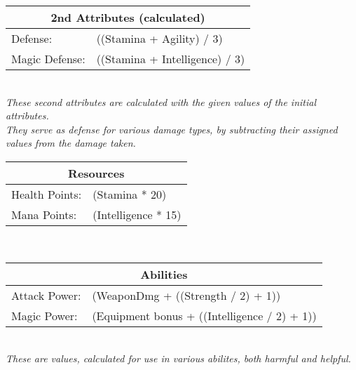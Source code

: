 \begin{center}
\begin{tabular}{|l l|}
\hline
\multicolumn{2}{|c|}{\textbf{2nd Attributes (calculated)}}\\
\hline
Defense: & ((Stamina + Agility) / 3)\\
\hline
Magic Defense: & ((Stamina + Intelligence) / 3)\\
\hline	
\end{tabular}\\
\emph{These second attributes are calculated with the given values of the initial attributes.\\ They serve as defense for various damage types, by subtracting their assigned values from the damage taken.}
\end{center}

\begin{center}
\begin{tabular}{|l l|}
\hline
\multicolumn{2}{|c|}{\textbf{Resources}}\\
\hline
Health Points: & (Stamina * 20)\\
\hline
Mana Points: & (Intelligence * 15)\\
\hline
\end{tabular}\\

\end{center}

\begin{center}
\begin{tabular}{|l l|}
\hline
\multicolumn{2}{|c|}{\textbf{Abilities}}\\
\hline
Attack Power: & (WeaponDmg + ((Strength / 2) + 1))\\
\hline
Magic Power: & (Equipment bonus + ((Intelligence / 2) + 1))\\
\hline
\end{tabular}\\
\emph{These are values, calculated for use in various abilites, both harmful and helpful.}
\end{center}


